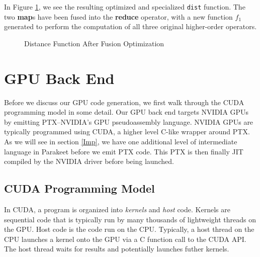 \documentclass[preprint]{sigplanconf}
\begin{document}
In Figure \ref{DistFuse}, we see the resulting optimized and specialized
\texttt{dist} function. The two \textbf{map}s have been fused into the
\textbf{reduce} operator, with a new function $f_1$ generated to perform the
computation of all three original higher-order operators.

\begin{figure}[h!]

\caption{Distance Function After Fusion Optimization}
\label{DistFuse}
\end{figure}

\section{GPU Back End}
Before we discuss our GPU code generation, we first walk through the CUDA
programming model in some detail.  Our GPU back end targets NVIDIA GPUs by
emitting PTX--NVIDIA's GPU pseudoassembly language.  NVIDIA GPUs are typically
programmed using CUDA, a higher level C-like wrapper around PTX.  As we will
see in section \ref{Imp}, we have one additional level of intermediate language
in Parakeet before we emit PTX code.  This PTX is then finally JIT compiled by
the NVIDIA driver before being launched.

\subsection{CUDA Programming Model}

In CUDA, a program is organized into {\it kernels} and {\it host} code.
Kernels are sequential code that is typically run by many thousands of
lightweight threads on the GPU.  Host code is the code run on the CPU.
Typically, a host thread on the CPU launches a kernel onto the GPU via a C
function call to the CUDA API.  The host thread waits for results and
potentially launches futher kernels.
\end{document}
